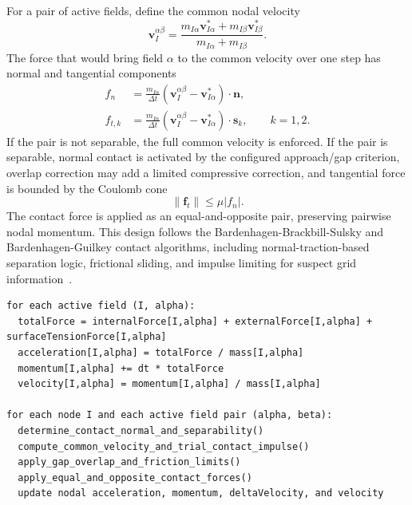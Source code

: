 For a pair of active fields, define the common nodal velocity
\begin{equation}
  \mathbf{v}_{I}^{\alpha\beta} = \frac{m_{I\alpha}\mathbf{v}_{I\alpha}^{\ast}+m_{I\beta}\mathbf{v}_{I\beta}^{\ast}}{m_{I\alpha}+m_{I\beta}}.
\end{equation}
The force that would bring field $\alpha$ to the common velocity over one step has normal and tangential components
\begin{align}
  f_n &= \frac{m_{I\alpha}}{\Delta t}\left(\mathbf{v}_{I}^{\alpha\beta}-\mathbf{v}_{I\alpha}^{\ast}\right)\cdot\mathbf{n}, \\
  f_{t,k} &= \frac{m_{I\alpha}}{\Delta t}\left(\mathbf{v}_{I}^{\alpha\beta}-\mathbf{v}_{I\alpha}^{\ast}\right)\cdot\mathbf{s}_k,
  \qquad k=1,2.
\end{align}
If the pair is not separable, the full common velocity is enforced.  If the pair is separable, normal contact is activated by the configured approach/gap criterion, overlap correction may add a limited compressive correction, and tangential force is bounded by the Coulomb cone
\begin{equation}
  \|\mathbf{f}_t\| \le \mu |f_n|.
\end{equation}
The contact force is applied as an equal-and-opposite pair, preserving pairwise nodal momentum.  This design follows the Bardenhagen-Brackbill-Sulsky and Bardenhagen-Guilkey contact algorithms, including normal-traction-based separation logic, frictional sliding, and impulse limiting for suspect grid information~\cite{bardenhagen2000granular,bardenhagen2001contact}.

\begin{lstlisting}[caption={Grid dynamics and contact.},basicstyle=\ttfamily\small]
for each active field (I, alpha):
  totalForce = internalForce[I,alpha] + externalForce[I,alpha] + surfaceTensionForce[I,alpha]
  acceleration[I,alpha] = totalForce / mass[I,alpha]
  momentum[I,alpha] += dt * totalForce
  velocity[I,alpha] = momentum[I,alpha] / mass[I,alpha]

for each node I and each active field pair (alpha, beta):
  determine_contact_normal_and_separability()
  compute_common_velocity_and_trial_contact_impulse()
  apply_gap_overlap_and_friction_limits()
  apply_equal_and_opposite_contact_forces()
  update nodal acceleration, momentum, deltaVelocity, and velocity
\end{lstlisting}

